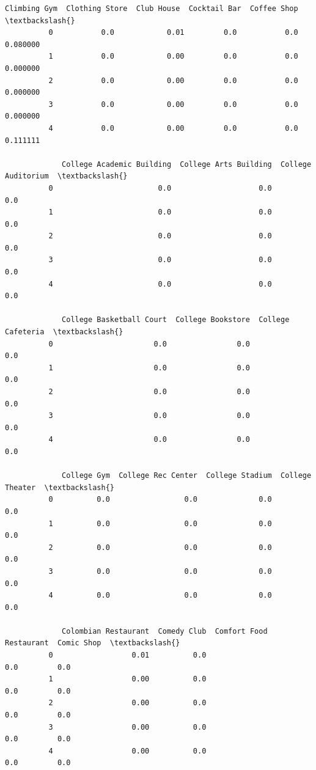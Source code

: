 \documentclass[11pt]{article}
\begin{document}
\begin{Verbatim}[commandchars=\\\{\}]
             Climbing Gym  Clothing Store  Club House  Cocktail Bar  Coffee Shop  \textbackslash{}
          0           0.0            0.01         0.0           0.0     0.080000   
          1           0.0            0.00         0.0           0.0     0.000000   
          2           0.0            0.00         0.0           0.0     0.000000   
          3           0.0            0.00         0.0           0.0     0.000000   
          4           0.0            0.00         0.0           0.0     0.111111   
          
             College Academic Building  College Arts Building  College Auditorium  \textbackslash{}
          0                        0.0                    0.0                 0.0   
          1                        0.0                    0.0                 0.0   
          2                        0.0                    0.0                 0.0   
          3                        0.0                    0.0                 0.0   
          4                        0.0                    0.0                 0.0   
          
             College Basketball Court  College Bookstore  College Cafeteria  \textbackslash{}
          0                       0.0                0.0                0.0   
          1                       0.0                0.0                0.0   
          2                       0.0                0.0                0.0   
          3                       0.0                0.0                0.0   
          4                       0.0                0.0                0.0   
          
             College Gym  College Rec Center  College Stadium  College Theater  \textbackslash{}
          0          0.0                 0.0              0.0              0.0   
          1          0.0                 0.0              0.0              0.0   
          2          0.0                 0.0              0.0              0.0   
          3          0.0                 0.0              0.0              0.0   
          4          0.0                 0.0              0.0              0.0   
          
             Colombian Restaurant  Comedy Club  Comfort Food Restaurant  Comic Shop  \textbackslash{}
          0                  0.01          0.0                      0.0         0.0   
          1                  0.00          0.0                      0.0         0.0   
          2                  0.00          0.0                      0.0         0.0   
          3                  0.00          0.0                      0.0         0.0   
          4                  0.00          0.0                      0.0         0.0   
          

\end{Verbatim}
\end{document}

